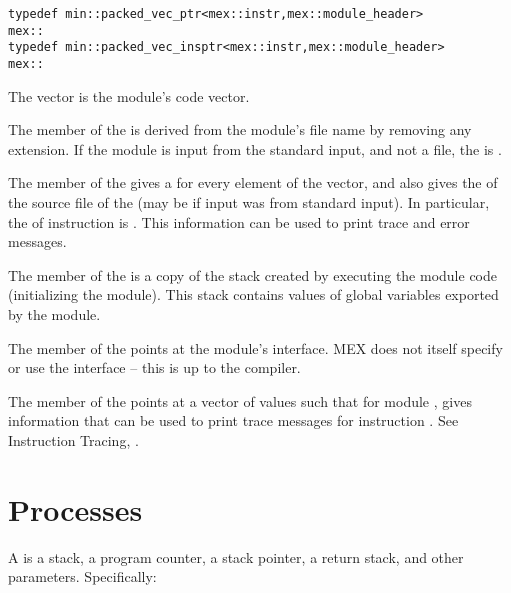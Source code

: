 \documentclass[12pt]{article}
\begin{document}
\begin{indpar}
\verb|typedef min::packed_vec_ptr<mex::instr,mex::module_header>| \\
\hspace*{3em}\verb|mex::|
\\[0.5ex]
\verb|typedef min::packed_vec_insptr<mex::instr,mex::module_header>| \\
\hspace*{3em}\verb|mex::|
\end{indpar}

The  vector is the module's code vector.

The  member of the  is derived
from the module's file name by removing any  extension.
If the module is input from the standard input, and not a file,
the  is .

The  member of the  gives a
 for every 
element of the  vector, and also gives the
 of the source
file of the  (may be  if input was
from standard input).  In particular, the 
of instruction  is .
This information can be used to
print trace and error messages.

The  member of the 
is a copy of the stack created by executing the module code
(initializing the module).
This stack contains values of global variables exported by the module.

The  member of the  points
at the module's interface.  MEX does not itself specify or use
the interface -- this is up to the compiler.

The  member of the  points
at a vector of  values such that for module ,
 gives information that can be used
to print trace messages for instruction .  See
Instruction Tracing, .

\section{Processes}
\label{PROCESSES}

A  is a stack, a program counter, a stack pointer,
a return stack, and other parameters.  Specifically:
\end{document}
